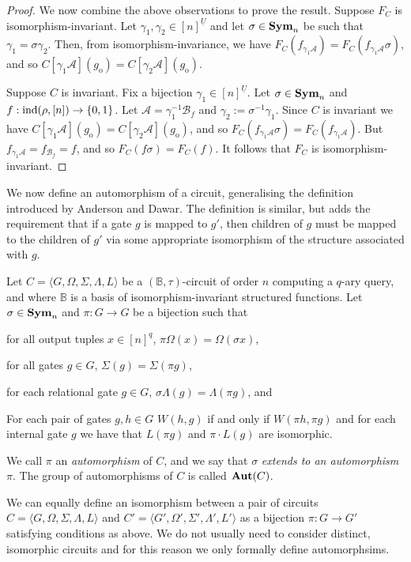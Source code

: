 \documentclass[../main/thesis.tex]{subfiles}
\begin{document}
\begin{proof}
  We now combine the above observations to prove the result. Suppose $F_C$ is
  isomorphism-invariant. Let $\gamma_1, \gamma_2 \in [n]^{\underline{U}}$ and
  let $\sigma \in \text{\textbf{Sym}}_n$ be such that $\gamma_1 = \sigma \gamma_2$. Then, from
  isomorphism-invariance, we have $F_C(f_{\gamma_1 \mathcal{A}}) = F_C (
  f_{\gamma_1 \mathcal{A}}\sigma)$, and so $C[\gamma_1
  \mathcal{A}](g_{\text{o}}) = C[\gamma_2 \mathcal{A}](g_{\text{o}})$.
  
  Suppose $C$ is invariant. Fix a bijection $\gamma_1 \in [n]^{\underline{U}}$.
  Let $\sigma \in \text{\textbf{Sym}}_n$ and $f: \text{\upshape ind}(\rho, [n]) \rightarrow \{0,1\}$. Let
  $\mathcal{A} = \gamma^{-1}_1 \mathcal{B}_f$ and $\gamma_2 :=
  \sigma^{-1}\gamma_1 $. Since $C$ is invariant we have $C[\gamma_1
  \mathcal{A}](g_{\text{o}}) = C[\gamma_2\mathcal{A}](g_{\text{o}})$, and so
  $F_C (f_{\gamma_1 \mathcal{A}} \sigma) = F_C(f_{\gamma_1 \mathcal{A}})$. But
  $f_{\gamma_1 \mathcal{A}} = f_{\mathcal{B}_f} = f$, and so $F_C (f \sigma) =
  F_C (f)$. It follows that $F_C$ is isomorphism-invariant.

\end{proof}

We now define an automorphism of a circuit, generalising the definition
introduced by Anderson and Dawar. The definition is similar, but adds the
requirement that if a gate $g$ is mapped to $g'$, then children of $g$ must be
mapped to the children of $g'$ via some appropriate isomorphism of the structure
associated with $g$.

\begin{definition}[Automorphism]\label{defn:automorphism}
  Let $C = \langle G, \Omega, \Sigma, \Lambda, L\rangle$ be a
  $(\mathbb{B},\tau)$-circuit of order $n$ computing a $q$-ary query, and where
  $\mathbb{B}$ is a basis of isomorphism-invariant structured functions. Let
  $\sigma \in \text{\textbf{Sym}}_n$ and $\pi: G \rightarrow G$ be a bijection such that
  \begin{myitemize}
  \item for all output tuples $x \in [n]^q$, $\pi \Omega (x) = \Omega (\sigma
    x)$,
  \item for all gates $g \in G$, $\Sigma (g) = \Sigma (\pi g)$,
  \item for each relational gate $g \in G$, $\sigma \Lambda (g) = \Lambda (\pi
    g)$, and
  \item For each pair of gates $g, h \in G$ $W(h,g)$ if and only if $W(\pi h,
    \pi g)$ and for each internal gate $g$ we have that $L(\pi g)$ and $ \pi
    \cdot L(g)$ are isomorphic.
  \end{myitemize}
  We call $\pi$ an \emph{automorphism} of $C$, and we say that $\sigma$
  \emph{extends to an automorphism} $\pi$. The group of automorphisms of $C$ is
  called $\text{\textbf{Aut}} (C)$.
\end{definition}
We can equally define an isomorphism between a pair of circuits $C = \langle G,
\Omega, \Sigma, \Lambda, L\rangle$ and $C' = \langle G', \Omega', \Sigma',
\Lambda', L'\rangle$ as a bijection $\pi: G \rightarrow G'$ satisfying
conditions as above. We do not usually need to consider distinct, isomorphic
circuits and for this reason we only formally define automorphsims.
\end{document}
